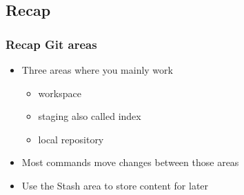 \subsection{Recap}
\begin{frame}
    \frametitle{Recap Git areas}
    \begin{itemize}
        \item Three areas where you mainly work
            \begin{itemize}
                \item workspace
                \item staging also called index
                \item local repository
            \end{itemize}
        \item Most commands move changes between those areas
        \item Use the Stash area to store content for later
    \end{itemize}
\end{frame}


